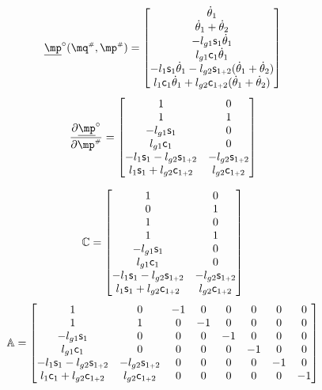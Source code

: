 \documentclass[a4paper,11pt,brazil,fleqn]{article}
\begin{document}
\begin{itemize}
\begin{equation}
\underline{\mp}\cir(\mq\ssh,\mp\ssh) =
\begin{bmatrix}
\dot{\theta}_1 \\
\dot{\theta}_1 + \dot{\theta}_2 \\
-l_{g1} \ssin_1 \dot{\theta}_1 \\
 l_{g1} \ccos_1 \dot{\theta}_1 \\
 -l_{1} \ssin_1 \dot{\theta}_1 - l_{g2} \ssin_{1\plus 2} ( \dot{\theta}_1 + \dot{\theta}_2 )\\
 l_{1} \ccos_1 \dot{\theta}_1 + l_{g2} \ccos_{1\plus 2} ( \dot{\theta}_1 + \dot{\theta}_2 )\\
\end{bmatrix}
\end{equation}
\begin{equation}
\frac{\partial \underline{\mp}\cir}{\partial \mp\ssh} =
\begin{bmatrix}
1 & 0 \\
1 & 1 \\
-l_{g1} \ssin_1 & 0 \\
 l_{g1} \ccos_1 & 0 \\
-l_{1} \ssin_1  - l_{g2} \ssin_{1\plus 2} & - l_{g2} \ssin_{1\plus 2} \\
 l_{1} \ssin_1  + l_{g2} \ccos_{1\plus 2} &   l_{g2} \ccos_{1\plus 2} \\
\end{bmatrix}
\end{equation}

\begin{equation}
\mathbb{C} =
\begin{bmatrix}
1 & 0 \\
0 & 1 \\
1 & 0 \\
1 & 1 \\
-l_{g1} \mathsf{s}_1 & 0 \\
 l_{g1} \mathsf{c}_1 & 0 \\
-l_{1} \mathsf{s}_1  - l_{g2} \mathsf{s}_{1{\scriptscriptstyle +} 2} & - l_{g2} \mathsf{s}_{1{\scriptscriptstyle +} 2} \\
 l_{1} \mathsf{s}_1  + l_{g2} \mathsf{c}_{1{\scriptscriptstyle +} 2} &   l_{g2} \mathsf{c}_{1{\scriptscriptstyle +} 2} \\
\end{bmatrix}
\end{equation}
\begin{equation}
\mathbb{A} =
\begin{bmatrix}
1 & 0 & -1 & 0 & 0 & 0 & 0 & 0 \\
1 & 1 & 0 & -1 & 0 & 0 & 0 & 0 \\
-l_{g1} \mathsf{s}_1 & 0 & 0 & 0 & -1 & 0 & 0 & 0 \\
 l_{g1} \mathsf{c}_1 & 0 & 0 & 0 & 0 & -1 & 0 & 0 \\
-l_{1} \mathsf{s}_1  - l_{g2} \mathsf{s}_{1{\scriptscriptstyle +} 2} & - l_{g2} \mathsf{s}_{1{\scriptscriptstyle +} 2} & 0 & 0 & 0 & 0 & -1 & 0 \\
 l_{1} \mathsf{c}_1  + l_{g2} \mathsf{c}_{1{\scriptscriptstyle +} 2} &   l_{g2} \mathsf{c}_{1{\scriptscriptstyle +} 2} & 0 & 0 & 0 & 0 & 0 & -1 \\
\end{bmatrix}
\end{equation}


\end{itemize}
\end{document}
